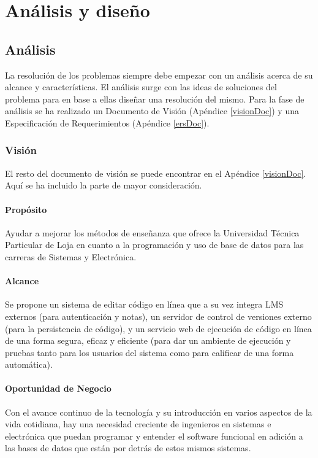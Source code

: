 ﻿%

\chapter{Análisis y diseño}
\label{capitulo3}

\section{Análisis}
La resolución de los problemas siempre debe empezar con un análisis acerca de su alcance y características. El análisis surge con las ideas de soluciones del problema para en base a ellas diseñar una resolución del mismo. Para la fase de análisis se ha realizado un Documento de Visión (Apéndice \ref{visionDoc}) y una Especificación de Requerimientos (Apéndice \ref{ersDoc}).

\subsection{Visión}
El resto del documento de visión se puede encontrar en el Apéndice \ref{visionDoc}. Aquí se ha incluido la parte de mayor consideración.

\subsubsection{Propósito}
Ayudar a mejorar los métodos de enseñanza que ofrece la Universidad Técnica Particular de Loja en cuanto a la programación y uso de base de datos para las carreras de Sistemas y Electrónica.

\subsubsection{Alcance}
      
Se propone un sistema de editar código en línea que a su vez integra LMS  externos (para autenticación y notas), un servidor de control de versiones externo (para la persistencia de código), y un servicio web de ejecución de código en línea de una forma segura, eficaz y eficiente (para dar un ambiente de ejecución y pruebas tanto para los usuarios del sistema como para calificar de una forma automática).

\subsubsection{Oportunidad de Negocio}
Con el avance continuo de la tecnología y su introducción en varios aspectos de la vida cotidiana, hay una necesidad creciente de ingenieros en sistemas e electrónica que puedan programar y entender el software funcional en adición a las bases de datos que están por detrás de estos mismos sistemas.

